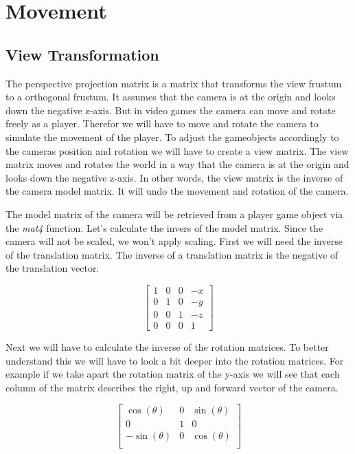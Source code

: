 \documentclass[12pt]{report} \usepackage{preamble}
\begin{document}
\section{Movement}

\subsection{View Transformation}

The perspective projection matrix is a matrix that transforms the view frustum to a orthogonal frustum.
It assumes that the camera is at the origin and looks down the negative z-axis. But in video games the camera can move and rotate
freely as a player. Therefor we will have to move and rotate the camera to simulate the movement of the player.
To adjust the gameobjects accordingly to the cameras position and rotation we will have to create a view matrix.
The view matrix moves and rotates the world in a way that the camera is at the origin and looks down the negative z-axis.
In other words, the view matrix is the inverse of the camera model matrix. It will undo the movement and rotation of the camera.

The model matrix of the camera will be retrieved from a player game object via the \textit{mat4} function.
Let's calculate the invers of the model matrix. Since the camera will not be scaled, we won't apply scaling.
First we will need the inverse of the translation matrix. The inverse of a translation matrix is the negative of the translation vector.

\[
	\begin{bmatrix}
		1 & 0 & 0 & -x \\
		0 & 1 & 0 & -y \\
		0 & 0 & 1 & -z \\
		0 & 0 & 0 & 1
	\end{bmatrix}
\]

Next we will have to calculate the inverse of the rotation matrices. To better understand this we will have to look a bit deeper into the rotation matrices.
For example if we take apart the rotation matrix of the y-axis we will see that each column of the matrix describes the right, up and forward vector of the camera.

\[
	\begin{bmatrix}
		\cos(\theta)  & 0 & \sin(\theta) \\
		0             & 1 & 0            \\
		-\sin(\theta) & 0 & \cos(\theta) \\
	\end{bmatrix}
\]
\end{document}
